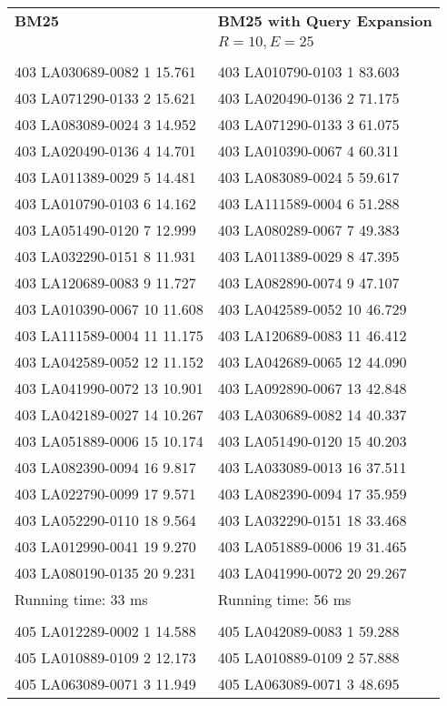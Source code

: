 \begin{tabular}{ l l }
\textbf{BM25} & \textbf{BM25 with Query Expansion}\\
              & $R = 10, E = 25$\\\\
403 LA030689-0082 1 15.761 & 403 LA010790-0103 1 83.603\\
403 LA071290-0133 2 15.621 & 403 LA020490-0136 2 71.175\\
403 LA083089-0024 3 14.952 & 403 LA071290-0133 3 61.075\\
403 LA020490-0136 4 14.701 & 403 LA010390-0067 4 60.311\\
403 LA011389-0029 5 14.481 & 403 LA083089-0024 5 59.617\\
403 LA010790-0103 6 14.162 & 403 LA111589-0004 6 51.288\\
403 LA051490-0120 7 12.999 & 403 LA080289-0067 7 49.383\\
403 LA032290-0151 8 11.931 & 403 LA011389-0029 8 47.395\\
403 LA120689-0083 9 11.727 & 403 LA082890-0074 9 47.107\\
403 LA010390-0067 10 11.608 & 403 LA042589-0052 10 46.729\\
403 LA111589-0004 11 11.175 & 403 LA120689-0083 11 46.412\\
403 LA042589-0052 12 11.152 & 403 LA042689-0065 12 44.090\\
403 LA041990-0072 13 10.901 & 403 LA092890-0067 13 42.848\\
403 LA042189-0027 14 10.267 & 403 LA030689-0082 14 40.337\\
403 LA051889-0006 15 10.174 & 403 LA051490-0120 15 40.203\\
403 LA082390-0094 16 9.817 & 403 LA033089-0013 16 37.511\\
403 LA022790-0099 17 9.571 & 403 LA082390-0094 17 35.959\\
403 LA052290-0110 18 9.564 & 403 LA032290-0151 18 33.468\\
403 LA012990-0041 19 9.270 & 403 LA051889-0006 19 31.465\\
403 LA080190-0135 20 9.231 & 403 LA041990-0072 20 29.267\\
Running time: 33 ms & Running time: 56 ms\\
\\
405 LA012289-0002 1 14.588 & 405 LA042089-0083 1 59.288\\
405 LA010889-0109 2 12.173 & 405 LA010889-0109 2 57.888\\
405 LA063089-0071 3 11.949 & 405 LA063089-0071 3 48.695\\

\end{tabular}
